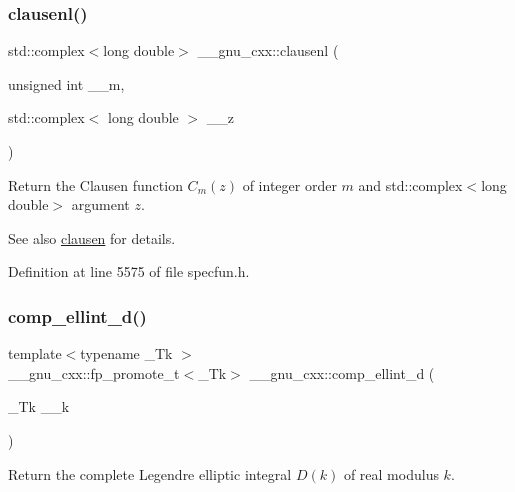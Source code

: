 \subsubsection{\texorpdfstring{clausenl()}{clausenl()}\hspace{0.1cm}{\footnotesize\ttfamily [2/2]}}
{\footnotesize\ttfamily std\+::complex$<$long double$>$ \+\_\+\+\_\+gnu\+\_\+cxx\+::clausenl (\begin{DoxyParamCaption}\item[{unsigned int}]{\+\_\+\+\_\+m,  }\item[{std\+::complex$<$ long double $>$}]{\+\_\+\+\_\+z }\end{DoxyParamCaption})\hspace{0.3cm}{\ttfamily [inline]}}

Return the Clausen function $ C_m(z) $ of integer order $ m $ and {\ttfamily std\+::complex$<$long double$>$} argument $ z $.

\begin{DoxySeeAlso}{See also}
\hyperlink{group__gnu__math__spec__func_ga54e4ba71b1f81718d6998349f91ff88f}{clausen} for details. 
\end{DoxySeeAlso}


Definition at line 5575 of file specfun.\+h.

\mbox{\label{group__gnu__math__spec__func_ga3fe79a91524b43ffc5ffb83c0eb2bd00}} 
\subsubsection{\texorpdfstring{comp\+\_\+ellint\+\_\+d()}{comp\_ellint\_d()}}
{\footnotesize\ttfamily template$<$typename \+\_\+\+Tk $>$ \\
\+\_\+\+\_\+gnu\+\_\+cxx\+::fp\+\_\+promote\+\_\+t$<$\+\_\+\+Tk$>$ \+\_\+\+\_\+gnu\+\_\+cxx\+::comp\+\_\+ellint\+\_\+d (\begin{DoxyParamCaption}\item[{\+\_\+\+Tk}]{\+\_\+\+\_\+k }\end{DoxyParamCaption})\hspace{0.3cm}{\ttfamily [inline]}}

Return the complete Legendre elliptic integral $ D(k) $ of real modulus $ k $.


